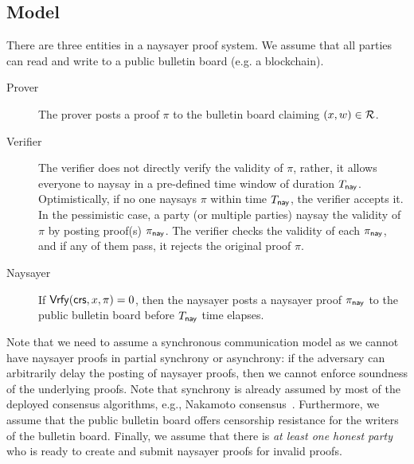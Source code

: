 \subsection{Model}

There are three entities in a naysayer proof system. We assume that all parties can read and write to a public bulletin board (e.g. a blockchain).
\begin{description}
    \item[Prover] The prover posts a proof $\pi$ to the bulletin board claiming $(x,w)\in\mathcal{R}$. 
    \item[Verifier] The verifier does not directly verify the validity of $\pi$, rather, it allows everyone to naysay in a pre-defined time window of duration $T_{\mathsf{nay}}$.
    Optimistically, if no one naysays $\pi$ within time $T_{\mathsf{nay}}$, the verifier accepts it. In the pessimistic case, a party (or multiple parties) naysay the validity of $\pi$ by posting proof(s) $\pi_{\mathsf{nay}}$. The verifier checks the validity of each $\pi_{\mathsf{nay}}$, and if any of them pass, it rejects the original proof $\pi$.
    \item[Naysayer] If $\mathsf{Vrfy}(\mathsf{crs}, x,\pi)=0$, then the naysayer posts a naysayer proof $\pi_{\mathsf{nay}}$ to the public bulletin board before $T_{\mathsf{nay}}$ time elapses.
\end{description}

Note that we need to assume a synchronous communication model as we cannot have naysayer proofs in partial synchrony or asynchrony: if the adversary can arbitrarily delay the posting of naysayer proofs, then we cannot enforce soundness of the underlying proofs. Note that synchrony is already assumed by most of the deployed consensus algorithms, e.g., Nakamoto consensus~\cite{Nakamoto08}. Furthermore, we assume that the public bulletin board offers censorship resistance for the writers of the bulletin board. Finally, we assume that there is \emph{at least one honest party} who is ready to create and submit naysayer proofs for invalid proofs.